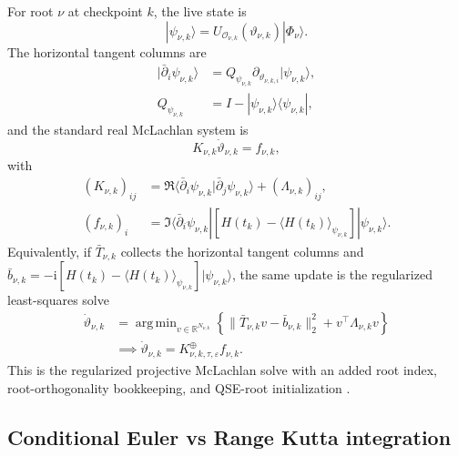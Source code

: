 \documentclass[
  reprint,
  amsmath,
  amssymb,
  aps,
  pra,
  nofootinbib,
  superscriptaddress,
  floatfix
]{revtex4-2}
\newcommand{\Oset}{\mathcal{O}}
\newcommand{\ii}{\mathrm{i}}
\newcommand{\argminp}{\mathop{\mathrm{arg\,min}}}
\newcommand{\eps}{\varepsilon}
\newcommand{\ket}[1]{|#1\rangle}
\newcommand{\bra}[1]{\langle #1|}
\newcommand{\braket}[2]{\langle #1|#2\rangle}
\newcommand{\expval}[1]{\langle #1\rangle}
\begin{document}
For root $\nu$ at checkpoint $k$, the live state is
\begin{equation}
\ket{\psi_{\nu,k}}=
U_{\Oset_{\nu,k}}(\vartheta_{\nu,k})\ket{\Phi_\nu}.
\label{eq:live_excited_checkpoint_state}
\end{equation}
The horizontal tangent columns are
\begin{equation}
\begin{aligned}
\ket{\bar\partial_i\psi_{\nu,k}}
&=
Q_{\psi_{\nu,k}}
\partial_{\vartheta_{\nu,k,i}}\ket{\psi_{\nu,k}},
\\
Q_{\psi_{\nu,k}}&=I-\ket{\psi_{\nu,k}}\bra{\psi_{\nu,k}},
\end{aligned}
\label{eq:excited_tangent_block}
\end{equation}
and the standard real McLachlan system is
\begin{equation}
K_{\nu,k}\dot\vartheta_{\nu,k}=f_{\nu,k},
\label{eq:excited_mclachlan_system}
\end{equation}
with
\begin{equation}
\begin{aligned}
(K_{\nu,k})_{ij}
&=
\Re\braket{\bar\partial_i\psi_{\nu,k}}{\bar\partial_j\psi_{\nu,k}}
+(\Lambda_{\nu,k})_{ij},
\\
(f_{\nu,k})_i
&=
\Im\bra{\bar\partial_i\psi_{\nu,k}}
\left[
H(t_k)-\expval{H(t_k)}_{\psi_{\nu,k}}
\right]
\ket{\psi_{\nu,k}} .
\end{aligned}
\label{eq:excited_gram_force}
\end{equation}
Equivalently, if $\bar T_{\nu,k}$ collects the horizontal tangent columns and
$\bar b_{\nu,k}=-\ii[H(t_k)-\expval{H(t_k)}_{\psi_{\nu,k}}]\ket{\psi_{\nu,k}}$, the same update is the regularized least-squares solve
\begin{equation}
\begin{aligned}
\dot\vartheta_{\nu,k}
&=
\argminp_{v\in\mathbb R^{N_{\nu,k}}}
\left\{
\|\bar T_{\nu,k}v-\bar b_{\nu,k}\|_2^2
+v^\top\Lambda_{\nu,k}v
\right\} \\
&\implies
\dot\vartheta_{\nu,k}
=
K_{\nu,k,\tau,\eps}^{\oplus}f_{\nu,k}.
\end{aligned}
\label{eq:excited_mclachlan_velocity}
\end{equation}
This is the regularized projective McLachlan solve with an added root index, root-orthogonality bookkeeping, and QSE-root initialization \cite{McLachlan1964,Yuan2019VQS}.

\subsection{Conditional Euler vs Range Kutta integration}
\end{document}
